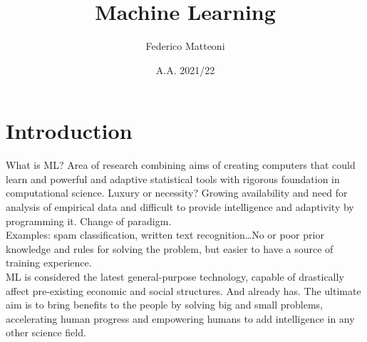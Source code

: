\documentclass[10pt]{report}
\begin{document}
\title{Machine Learning}
\author{Federico Matteoni}
\date{A.A. 2021/22}
\renewcommand*\contentsname{Index}

\maketitle
\begin{multicols}{2}
\tableofcontents
\end{multicols}
\pagebreak
\section{Introduction}
What is ML? Area of research combining aims of creating computers that could learn and powerful and adaptive statistical tools with rigorous foundation in computational science. Luxury or necessity? Growing availability and need for analysis of empirical data and difficult to provide intelligence and adaptivity by programming it. Change of paradigm.\\
Examples: spam classification, written text recognition\ldots No or poor prior knowledge and rules for solving the problem, but easier to have a source of training experience.\\
ML is considered the latest general-purpose technology, capable of drastically affect pre-existing economic and social structures. And already has. The ultimate aim is to bring benefits to the people by solving big and small problems, accelerating human progress and empowering humans to add intelligence in any other science field.
\end{document}
